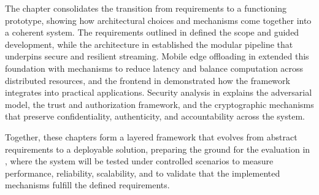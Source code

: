 \quad The \textbf{} chapter consolidates the transition from requirements to a functioning prototype, showing how architectural choices and mechanisms come together into a coherent system. The requirements outlined in \textbf{} defined the scope and guided development, while the architecture in \textbf{} established the modular pipeline that underpins secure and resilient streaming. Mobile edge offloading in \textbf{} extended this foundation with mechanisms to reduce latency and balance computation across distributed resources, and the frontend in \textbf{} demonstrated how the framework integrates into practical applications. Security analysis in \textbf{} explains the adversarial model, the trust and authorization framework, and the cryptographic mechanisms that preserve confidentiality, authenticity, and accountability across the system. 

\quad Together, these chapters form a layered framework that evolves from abstract requirements to a deployable solution, preparing the ground for the evaluation in \textbf{}, where the system will be tested under controlled scenarios to measure performance, reliability, scalability, and to validate that the implemented mechanisms fulfill the defined requirements.
